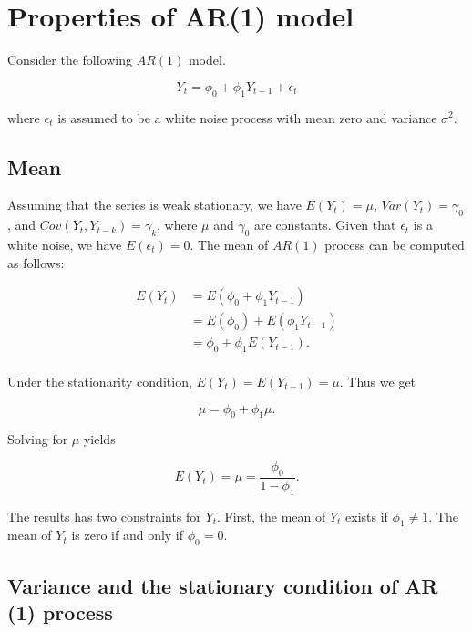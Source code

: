 \documentclass[
  11pt,
  a4paper,
]{report}
\begin{document}
\section{Properties of AR(1) model}\label{properties-of-ar1-model}

Consider the following \(AR(1)\) model.

\begin{equation}
  \label{eq:ar}
Y_t=\phi_0+\phi_1Y_{t-1}+\epsilon_{t}
\end{equation}

where \({\epsilon_t}\) is assumed to be a white noise process with mean
zero and variance \(\sigma^2\).

\subsection{Mean}\label{mean}

Assuming that the series is weak stationary, we have \(E(Y_t)=\mu\),
\(Var(Y_t)=\gamma_0\), and \(Cov(Y_t, Y_{t-k})=\gamma_k\), where \(\mu\)
and \(\gamma_0\) are constants. Given that \({\epsilon_t}\) is a white
noise, we have \(E(\epsilon_t)=0\). The mean of \(AR(1)\) process can be
computed as follows:

\[
\begin{aligned}
  E(Y_t) &= E(\phi_0+\phi_1 Y_{t-1}) \\
         &= E(\phi_0) +E(\phi_1 Y_{t-1}) \\
         &= \phi_0 +\phi_1 E(Y_{t-1}). \\
\end{aligned}
\]

Under the stationarity condition, \(E(Y_t)=E(Y_{t-1})=\mu\). Thus we get

\[\mu = \phi_0+\phi_1\mu.\]

Solving for \(\mu\) yields

\begin{equation}
  \label{eq:2}
E(Y_t)=\mu=\frac{\phi_0}{1-\phi_1}.
\end{equation}

The results has two constraints for \(Y_t\). First, the mean of \(Y_t\)
exists if \(\phi_1 \neq 1 .\) The mean of \(Y_t\) is zero if and only if
\(\phi_0=0\).

\subsection{Variance and the stationary condition of AR (1)
process}\label{variance-and-the-stationary-condition-of-ar-1-process}
\end{document}
